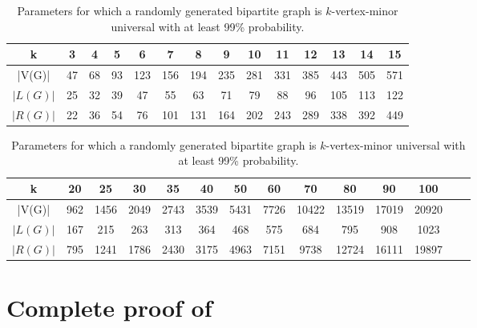 \documentclass[10pt,a4paper]{article}
\begin{document}
\begin{table}[ht]
    \centering
    \caption{Parameters for which a randomly generated bipartite graph is $k$-vertex-minor universal with at least 99\% probability. }
    \begin{tabular}{|c|c|c|c|c|c|c|c|c|c|c|c|c|c|}
        \hline
        k               & 3  & 4  & 5  & 6  & 7  & 8  & 9  & 10  & 11  & 12  & 13  & 14  & 15  \\
        \hline
        |V(G)|  & 47  & 68  & 93  & 123  & 156  & 194  & 235  & 281  & 331  & 385  & 443  & 505  & 571 \\
        \hline
        $|L(G)|$  & 25  & 32  & 39  & 47  & 55  & 63  & 71  & 79  & 88  & 96  & 105  & 113  & 122 \\
        \hline
        $|R(G)|$ & 22  & 36  & 54  & 76  & 101  & 131  & 164  & 202  & 243  & 289  & 338  & 392  & 449 \\
        \hline
    \end{tabular}

    \bigskip

    \begin{tabular}{|c|c|c|c|c|c|c|c|c|c|c|c|c|c|}
        \hline
        k    & 20  & 25  & 30  & 35  & 40  & 50  & 60  & 70  & 80  & 90  & 100 \\
        \hline
        |V(G)|  & 962  & 1456  & 2049  & 2743  & 3539  & 5431  & 7726  & 10422  & 13519  & 17019  & 20920 \\
        \hline
        $|L(G)|$  & 167  & 215  & 263  & 313  & 364  & 468  & 575  & 684  & 795  & 908  & 1023 \\
        \hline
        $|R(G)|$  & 795  & 1241  & 1786  & 2430  & 3175  & 4963  & 7151  & 9738  & 12724  & 16111  & 19897 \\
        \hline
    \end{tabular}

    \label{tab:exists_kvmu99}

\end{table}

\section{Complete proof of  }
    \label{proof:bipartite-vmu}
    \firstbipartitevmu*
    
\end{document}
